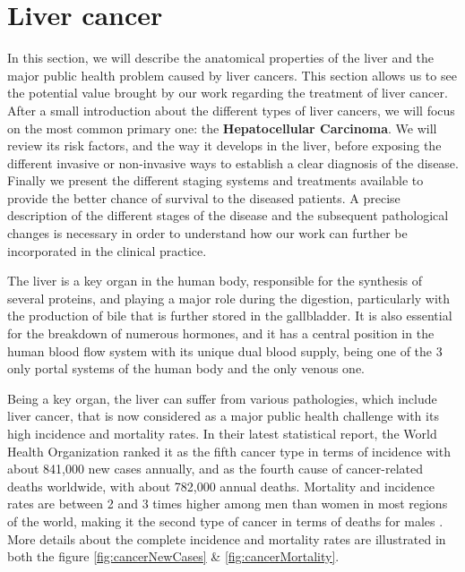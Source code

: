 \documentclass[]{article}
\begin{document}
\section*{Liver cancer}


In this section, we will describe the anatomical properties of the liver
and the major public health problem caused by liver cancers. This
section allows us to see the potential value brought by our work
regarding the treatment of liver cancer.
After a small introduction about the different types of liver cancers,
we will focus on the most common primary one: the \textbf{Hepatocellular
Carcinoma}. We will review its risk factors, and the way it develops in
the liver, before exposing the different invasive or non-invasive ways
to establish a clear diagnosis of the disease. Finally we present the
different staging systems and treatments available to provide the better
chance of survival to the diseased patients. A precise description of
the different stages of the disease and the subsequent pathological
changes is necessary in order to understand how our work can further be
incorporated in the clinical practice.

The liver is a key organ in the human body, responsible for the
synthesis of several proteins, and playing a major role during the
digestion, particularly with the production of bile that is further
stored in the gallbladder. It is also essential for the breakdown of
numerous hormones, and it has a central position in the human blood flow
system with its unique dual blood supply, being one of the 3 only portal
systems of the human body and the only venous one.

Being a key organ, the liver can suffer from various pathologies, which
include liver cancer, that is now considered as a major public health
challenge with its high incidence and mortality rates. In their latest
statistical report, the World Health Organization ranked it as the fifth
cancer type in terms of incidence with about 841,000 new cases annually,
and as the fourth cause of cancer-related deaths worldwide, with about
782,000 annual deaths. Mortality and incidence rates are between 2 and 3
times higher among men than women in most regions of the world, making
it the second type of cancer in terms of deaths for males \cite{F.Bray2018a}. More details about the complete incidence and mortality rates are illustrated in both the figure \ref{fig:cancerNewCases} \& \ref{fig:cancerMortality}. \\
\end{document}
